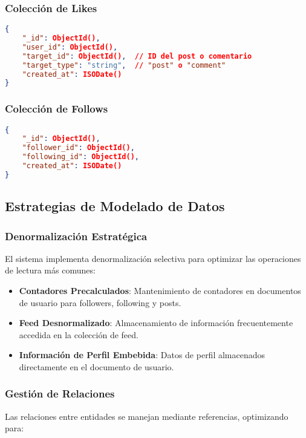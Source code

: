 \documentclass[12pt,letterpaper]{article}
\begin{document}
\subsubsection{Colección de Likes}
\begin{lstlisting}[language=json]
{
    "_id": ObjectId(),
    "user_id": ObjectId(),
    "target_id": ObjectId(),  // ID del post o comentario
    "target_type": "string",  // "post" o "comment"
    "created_at": ISODate()
}
\end{lstlisting}

\subsubsection{Colección de Follows}
\begin{lstlisting}[language=json]
{
    "_id": ObjectId(),
    "follower_id": ObjectId(),
    "following_id": ObjectId(),
    "created_at": ISODate()
}
\end{lstlisting}

\subsection{Estrategias de Modelado de Datos}

\subsubsection{Denormalización Estratégica}
El sistema implementa denormalización selectiva para optimizar las operaciones de lectura más comunes:

\begin{itemize}
    \item \textbf{Contadores Precalculados}: Mantenimiento de contadores en documentos de usuario para followers, following y posts.
    \item \textbf{Feed Desnormalizado}: Almacenamiento de información frecuentemente accedida en la colección de feed.
    \item \textbf{Información de Perfil Embebida}: Datos de perfil almacenados directamente en el documento de usuario.
\end{itemize}

\subsubsection{Gestión de Relaciones}
Las relaciones entre entidades se manejan mediante referencias, optimizando para:
\end{document}
